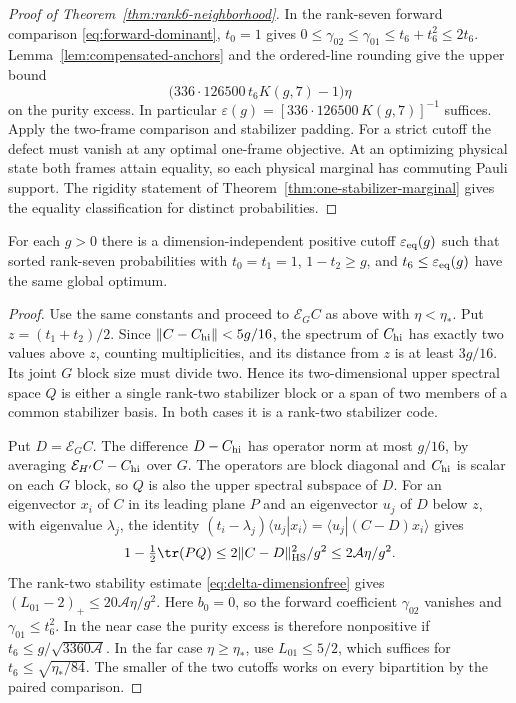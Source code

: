 \begin{proof}[Proof of Theorem~\ref{thm:rank6-neighborhood}]
In the rank-seven forward comparison
\eqref{eq:forward-dominant}, \(t_0=1\) gives
\(0\le\gamma_{02}\le\gamma_{01}\le t_6+t_6^2\le2t_6\).
Lemma~\ref{lem:compensated-anchors} and the ordered-line
rounding give the upper bound
\[
  \bigl(336\cdot126500\,t_6 K(g,7)-1\bigr)\eta
\]
on the purity excess. In particular
\(\varepsilon(g)=[336\cdot126500\,K(g,7)]^{-1}\) suffices.
Apply the two-frame comparison and stabilizer padding.
For a strict cutoff the defect must vanish at any optimal
one-frame objective. At an optimizing physical state both
frames attain equality, so each physical marginal has
commuting Pauli support. The rigidity statement of
Theorem~\ref{thm:one-stabilizer-marginal} gives the equality
classification for distinct probabilities.
\end{proof}

\begin{theorem}\label{thm:doublet-boundary}
For each \(g>0\) there is a dimension-independent positive
cutoff \(\varepsilon_{\rm eq}(g)\) such that sorted rank-seven
probabilities with \(t_0=t_1=1\), \(1-t_2\ge g\), and
\(t_6\le\varepsilon_{\rm eq}(g)\) have the same global optimum.
\end{theorem}

\begin{proof}
Use the same constants and proceed to \(\mathcal E_G C\) as above
with \(\eta<\eta_*\). Put \(z=(t_1+t_2)/2\). Since
\(\|C-C_{\rm hi}\|<5g/16\), the spectrum of \(C_{\rm hi}\) has
exactly two values above \(z\), counting multiplicities, and its
distance from \(z\) is at least \(3g/16\). Its joint \(G\) block
size must divide two. Hence its two-dimensional upper spectral
space \(Q\) is either a single rank-two stabilizer block or a
span of two members of a common stabilizer basis. In both cases
it is a rank-two stabilizer code.

Put \(D=\mathcal E_G C\). The difference \(D-C_{\rm hi}\) has
operator norm at most \(g/16\), by averaging
\(\mathcal E_{H'}C-C_{\rm hi}\) over \(G\). The operators are
block diagonal and \(C_{\rm hi}\) is scalar on each \(G\) block,
so \(Q\) is also the upper spectral subspace of \(D\).
For an eigenvector \(x_i\) of \(C\) in its leading plane \(P\)
and an eigenvector \(u_j\) of \(D\) below \(z\), with eigenvalue
\(\lambda_j\), the identity
\((t_i-\lambda_j)\langle u_j|x_i\rangle
=\langle u_j|(C-D)x_i\rangle\) gives
\[
 1-\tfrac12\tr(PQ)\le 2\|C-D\|_{\rm HS}^2/g^2
                    \le 2\mathcal A\eta/g^2.
\]
The rank-two stability estimate \eqref{eq:delta-dimensionfree}
gives \((L_{01}-2)_+\le20\mathcal A\eta/g^2\).
Here \(b_0=0\), so the forward coefficient \(\gamma_{02}\)
vanishes and \(\gamma_{01}\le t_6^2\).
In the near case the purity excess is therefore nonpositive
if \(t_6\le g/\sqrt{3360\mathcal A}\). In the far case
\(\eta\ge\eta_*\), use \(L_{01}\le5/2\), which suffices for
\(t_6\le\sqrt{\eta_*/84}\). The smaller of the two cutoffs works
on every bipartition by the paired comparison.
\end{proof}

